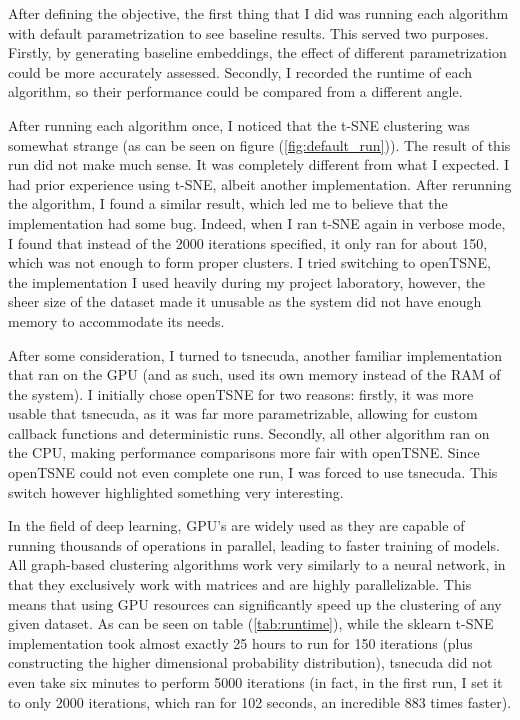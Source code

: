 After defining the objective, the first thing that I did was running each algorithm with default parametrization to see baseline results. This served two purposes. Firstly, by generating baseline embeddings, the effect of different parametrization could be more accurately assessed. Secondly, I recorded the runtime of each algorithm, so their performance could be compared from a different angle.

After running each algorithm once, I noticed that the t-SNE clustering was somewhat strange (as can be seen on figure (\ref{fig:default_run})). The result of this run did not make much sense. It was completely different from what I expected. I had prior experience using t-SNE, albeit another implementation. After rerunning the algorithm, I found a similar result, which led me to believe that the implementation had some bug. Indeed, when I ran t-SNE again in verbose mode, I found that instead of the 2000 iterations specified, it only ran for about 150, which was not enough to form proper clusters. I tried switching to openTSNE, the implementation I used heavily during my project laboratory, however, the sheer size of the dataset made it unusable as the system did not have enough memory to accommodate its needs.

After some consideration, I turned to tsnecuda, another familiar implementation that ran on the GPU (and as such, used its own memory instead of the RAM of the system). I initially chose openTSNE for two reasons: firstly, it was more usable that tsnecuda, as it was far more parametrizable, allowing for custom callback functions and deterministic runs. Secondly, all other algorithm ran on the CPU, making performance comparisons more fair with openTSNE. Since openTSNE could not even complete one run, I was forced to use tsnecuda. This switch however highlighted something very interesting.

In the field of deep learning, GPU's are widely used as they are capable of running thousands of operations in parallel, leading to faster training of models. All graph-based clustering algorithms work very similarly to a neural network, in that they exclusively work with matrices and are highly parallelizable. This means that using GPU resources can significantly speed up the clustering of any given dataset. As can be seen on table (\ref{tab:runtime}), while the sklearn t-SNE implementation took almost exactly 25 hours to run for 150 iterations (plus constructing the higher dimensional probability distribution), tsnecuda did not even take six minutes to perform 5000 iterations (in fact, in the first run, I set it to only 2000 iterations, which ran for 102 seconds, an incredible 883 times faster).

